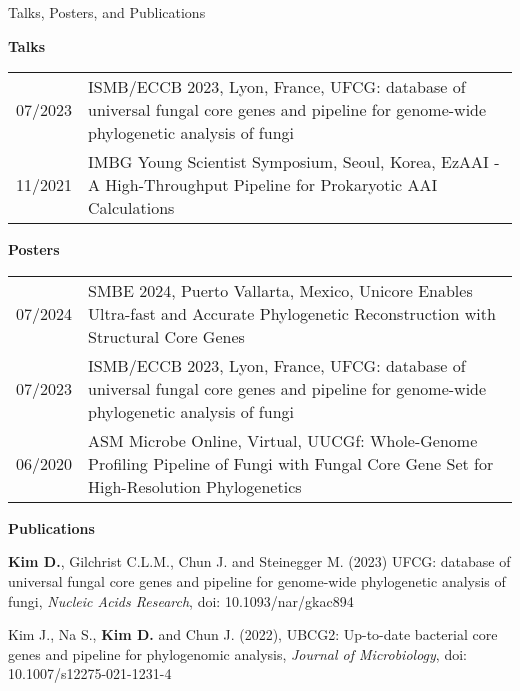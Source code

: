 \documentclass{resume} %
\begin{document}
\begin{rSection}{Talks, Posters, and Publications}
\vspace{2mm}

{\bf Talks }\vspace{1mm}

\begin{tabular}{p{2.5cm}p{14.1cm}}
07/2023 & ISMB/ECCB 2023, Lyon, France, UFCG: database of universal fungal core genes and pipeline for genome-wide phylogenetic analysis of fungi
\\[1mm]
11/2021 & IMBG Young Scientist Symposium, Seoul, Korea, EzAAI - A High-Throughput Pipeline for Prokaryotic AAI Calculations
\\[1mm]
\end{tabular}
\vspace{1mm}

{\bf Posters }\vspace{1mm}

\begin{tabular}{p{2.5cm}p{14.1cm}}
07/2024 & SMBE 2024, Puerto Vallarta, Mexico, Unicore Enables Ultra-fast and Accurate Phylogenetic Reconstruction with Structural Core Genes
\\[1mm]
07/2023 & ISMB/ECCB 2023, Lyon, France, UFCG: database of universal fungal core genes and pipeline for genome-wide phylogenetic analysis of fungi
\\[1mm]
06/2020 & ASM Microbe Online, Virtual, UUCGf: Whole-Genome Profiling Pipeline of Fungi with Fungal Core Gene Set for High-Resolution Phylogenetics
\\[1mm]
\end{tabular}
\vspace{1mm}


{\bf Publications}\\[-26mm]

\begin{thebibliography}{10}

\vspace{8mm}
{\bf Kim D.}, Gilchrist C.L.M., Chun J. and Steinegger M. (2023)
UFCG: database of universal fungal core genes and pipeline for genome-wide phylogenetic analysis of fungi, {\em Nucleic Acids Research}, doi: 10.1093/nar/gkac894

Kim J., Na S., {\bf Kim D.} and Chun J.  (2022), 
UBCG2: Up-to-date bacterial core genes and pipeline for phylogenomic analysis, {\em Journal of Microbiology}, doi: 10.1007/s12275-021-1231-4


\end{thebibliography}
\end{rSection}
\end{document}
